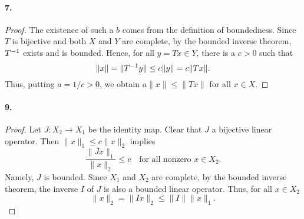   \paragraph{7.}
  \begin{proof}
    The existence of such a $b$ comes from the definition of boundedness. Since 
    $T$ is bijective and both $X$ and $Y$ are complete, by the bounded inverse
    theorem, $T^{-1}$ exists and is bounded. Hence, for all $y=Tx\in Y$, there is
    a $c>0$ such that
    \[
      \|x\|=\|T^{-1} y\|\le c\|y\|=c\|Tx\|.
    \]
    Thus, putting $a=1/c>0$, we obtain $a\|x\|\le\|Tx\|$ for all $x\in X$.
  \end{proof}
  
  \paragraph{9.}
  \begin{proof}
    Let $J:X_2\to X_1$ be the identity map. Clear that $J$ a bijective linear
    operator. Then $\|x\|_1\le c\|x\|_2$ implies
    \[
      \frac{\|Jx\|_1}{\|x\|_2}\le c\quad\text{for all nonzero $x\in X_2$}.
    \]
    Namely, $J$ is bounded. Since $X_1$ and $X_2$ are complete, by the bounded
    inverse theorem, the inverse $I$ of $J$ is also a bounded linear operator.
    Thus, for all $x\in X_2$
    \[
      \|x\|_2=\|Ix\|_2\le \|I\|\|x\|_1.
    \]
  \end{proof}

















